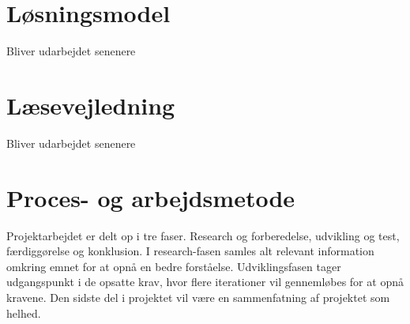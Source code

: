 \section{Løsningsmodel}
Bliver udarbejdet senenere

\section{Læsevejledning}
Bliver udarbejdet senenere

\section{Proces- og arbejdsmetode}
Projektarbejdet er delt op i tre faser. Research og forberedelse, udvikling og test, færdiggørelse og konklusion. I research-fasen samles alt relevant information omkring emnet for at opnå en bedre forståelse. Udviklingsfasen tager udgangspunkt i de opsatte krav, hvor flere iterationer vil gennemløbes for at opnå kravene. Den sidste del i projektet vil være en sammenfatning af projektet som helhed.




